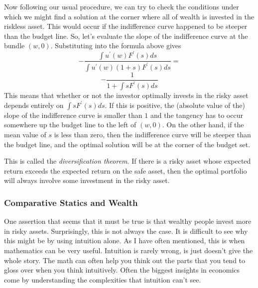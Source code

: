 \documentclass[12pt]{article}
\begin{document}
Now following our usual procedure, we can try to check the conditions under
which we might find a solution at the corner where all of wealth is invested
in the riskless asset. This would occur if the indifference curve happened to
be steeper than the budget line. So, let's evaluate the slope of the
indifference curve at the bundle $\left(  w,0\right)  $. Substituting into the
formula above gives%
\[
-\frac{\int u^{\prime}\left(  w\right)  F^{\prime}\left(  s\right)  ds}{\int
u^{\prime}\left(  w\right)  \left(  1+s\right)  F^{\prime}\left(  s\right)
ds}=
\]%
\[
-\frac{1}{1+\int sF^{\prime}\left(  s\right)  ds}%
\]
This means that whether or not the investor optimally invests in the risky
asset depends entirely on $\int sF^{\prime}\left(  s\right)  ds$. If this is
positive, the (absolute value of the) slope of the indifference curve is
smaller than $1$ and the tangency has to occur somewhere up the budget line to
the left of $\left(  w,0\right)  $. On the other hand, if the mean value of
$s$ is less than zero, then the indifference curve will be steeper than the
budget line, and the optimal solution will be at the corner of the budget set.

This is called the \emph{diversification theorem}. If there is a risky asset
whose expected return exceeds the expected return on the safe asset, then the
optimal portfolio will always involve some investment in the risky asset.

\subsubsection{Comparative Statics and Wealth}

One assertion that seems that it must be true is that wealthy people invest
more in risky assets. Surprisingly, this is not always the case. It is
difficult to see why this might be by using intuition alone. As I have often
mentioned, this is when mathematics can be very useful. Intuition is rarely
wrong, is just doesn't give the whole story. The math can often help you think
out the parts that you tend to gloss over when you think intuitively. Often
the biggest insights in economics come by understanding the complexities that
intuition can't see.
\end{document}
